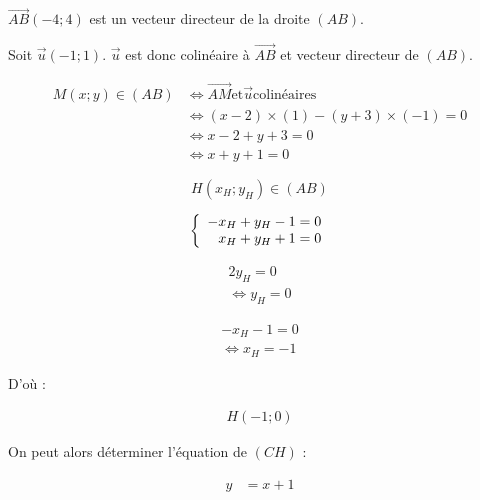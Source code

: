 \documentclass[12pt]{article}
\begin{document}
$\overrightarrow{AB}(-4;4)$ est un vecteur directeur de la droite $(AB)$.

Soit $\overrightarrow{u}(-1;1)$. $\overrightarrow{u}$ est donc colinéaire à $\overrightarrow{AB}$ et vecteur directeur de $(AB)$.

\begin{align*}
M(x;y) \in (AB) &\Leftrightarrow \overrightarrow{AM} \text{et} \overrightarrow{u} \text{colinéaires}\\
&\Leftrightarrow (x - 2) \times (1) - (y + 3) \times (-1) = 0\\
&\Leftrightarrow x - 2 + y + 3 = 0\\
&\Leftrightarrow x + y + 1 = 0
\end{align*}

\[
H(x_H; y_H) \in (AB)
\]

\[
\left\{
\begin{array}{r c l}
-x_H + y_H - 1 = 0\\
x_H + y_H + 1 = 0
\end{array}
\right.
\]

\begin{align*}
2y_H = 0\\
\Leftrightarrow y_H = 0
\end{align*}

\begin{align*}
-x_H - 1 = 0\\
\Leftrightarrow x_H = -1
\end{align*}

D'où :

\begin{align*}
H(-1;0)
\end{align*}

On peut alors déterminer l'équation de $(CH)$ :

\begin{align*}
y &= x + 1
\end{align*}
\end{document}
